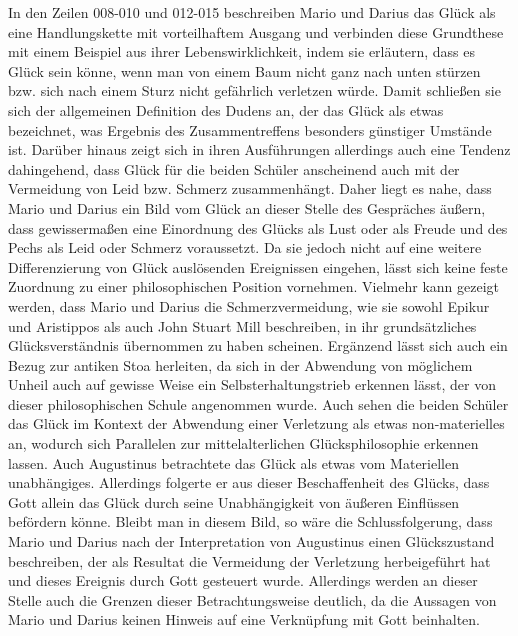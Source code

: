 In den Zeilen 008-010 und 012-015 beschreiben Mario und Darius das Glück als eine Handlungskette mit vorteilhaftem Ausgang und verbinden diese Grundthese mit einem Beispiel aus ihrer Lebenswirklichkeit, indem sie erläutern, dass es Glück sein könne, wenn man von einem Baum nicht ganz nach unten stürzen bzw. sich nach einem Sturz nicht gefährlich verletzen würde. 
Damit schließen sie sich der allgemeinen Definition des Dudens an, der das Glück als etwas bezeichnet, \glqq was Ergebnis des Zusammentreffens besonders günstiger Umstände ist\grqq{}\cite{D16}.
Darüber hinaus zeigt sich in ihren Ausführungen allerdings auch eine Tendenz dahingehend, dass Glück für die beiden Schüler anscheinend auch mit der Vermeidung von Leid bzw. Schmerz zusammenhängt. 
Daher liegt es nahe, dass Mario und Darius ein Bild vom Glück an dieser Stelle des Gespräches äußern, dass gewissermaßen eine Einordnung des Glücks als Lust oder als Freude und des Pechs als Leid oder Schmerz voraussetzt. 
Da sie jedoch nicht auf eine weitere Differenzierung von Glück auslösenden Ereignissen eingehen, lässt sich keine feste Zuordnung zu einer philosophischen Position vornehmen. 
Vielmehr kann gezeigt werden, dass Mario und Darius die Schmerzvermeidung, wie sie sowohl Epikur und Aristippos als auch John Stuart Mill beschreiben, in ihr grundsätzliches Glücksverständnis übernommen zu haben scheinen. 
Ergänzend lässt sich auch ein Bezug zur antiken Stoa herleiten, da sich in der Abwendung von möglichem Unheil auch auf gewisse Weise ein Selbsterhaltungstrieb erkennen lässt, der von dieser philosophischen Schule angenommen wurde. 
Auch sehen die beiden Schüler das Glück im Kontext der Abwendung einer Verletzung als etwas non-materielles an, wodurch sich Parallelen zur mittelalterlichen Glücksphilosophie erkennen lassen. 
Auch Augustinus betrachtete das Glück als etwas vom Materiellen unabhängiges. 
Allerdings folgerte er aus dieser Beschaffenheit des Glücks, dass Gott allein das Glück durch seine Unabhängigkeit von äußeren Einflüssen befördern könne. 
Bleibt man in diesem Bild, so wäre die Schlussfolgerung, dass Mario und Darius nach der Interpretation von Augustinus einen Glückszustand beschreiben, der als Resultat die Vermeidung der Verletzung herbeigeführt hat und dieses Ereignis durch Gott gesteuert wurde. 
Allerdings werden an dieser Stelle auch die Grenzen dieser Betrachtungsweise deutlich, da die Aussagen von Mario und Darius keinen Hinweis auf eine Verknüpfung mit Gott beinhalten.

